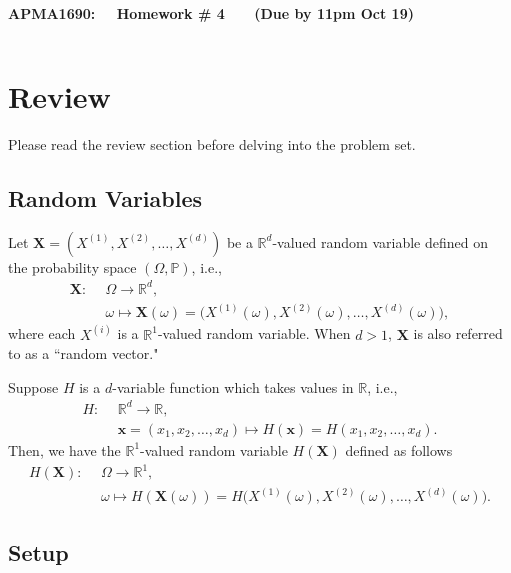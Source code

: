 \documentclass[11pt,letterpaper, leqno]{article}
\numberwithin{equation}{section}
\numberwithin{theorem}{section}
\numberwithin{lemma}{section}
\numberwithin{corollary}{section}
\numberwithin{definition}{section}
\numberwithin{proposition}{section}
\numberwithin{remark}{section}
\numberwithin{example}{section}
\begin{document}
\begin{center}
{\bf \Large APMA1690: ~~Homework \# 4 ~~~(Due by 11pm Oct 19)}
\end{center}
\[\]
\medskip

\section{Review}

Please read the review section before delving into the problem set.

\subsection{Random Variables}

Let $\boldsymbol{X}=(X^{(1)}, X^{(2)},\ldots,X^{(d)})$ be a $\mathbb{R}^d$-valued random variable defined on the probability space $(\Omega,\mathbb{P})$, i.e.,
\begin{align*}
    \boldsymbol{X}: \ \ & \Omega\rightarrow\mathbb{R}^d, \\
    & \omega \mapsto \boldsymbol{X}(\omega)=\Big(X^{(1)}(\omega), X^{(2)}(\omega), \ldots, X^{(d)}(\omega)\Big),
\end{align*}
where each $X^{(i)}$ is a $\mathbb{R}^1$-valued random variable. When $d>1$, $\boldsymbol{X}$ is also referred to as a ``random vector."

Suppose $H$ is a $d$-variable function which takes values in $\mathbb{R}$, i.e., 
\begin{align*}
    H:\ \ & \mathbb{R}^d \rightarrow \mathbb{R}, \\
    & \boldsymbol{x}=(x_1, x_2,\ldots,x_d) \mapsto H(\boldsymbol{x})=H(x_1, x_2,\ldots,x_d).
\end{align*}
Then, we have the $\mathbb{R}^1$-valued random variable $H(\boldsymbol{X})$ defined as follows
\begin{align*}
    H(\boldsymbol{X}): \ \ & \Omega\rightarrow\mathbb{R}^1, \\
    & \omega \mapsto H\left(\boldsymbol{X}(\omega)\right)=H\Big(X^{(1)}(\omega), X^{(2)}(\omega), \ldots, X^{(d)}(\omega)\Big).
\end{align*}

\subsection{Setup}
\end{document}
